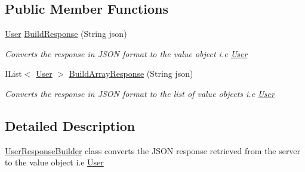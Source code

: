 \subsection*{Public Member Functions}
\begin{DoxyCompactItemize}
\item 
\hyperlink{classcom_1_1shephertz_1_1app42_1_1paas_1_1sdk_1_1csharp_1_1user_1_1_user}{User} \hyperlink{classcom_1_1shephertz_1_1app42_1_1paas_1_1sdk_1_1csharp_1_1user_1_1_user_response_builder_a3ecd2ba253a69bbaa30b44f162b0c8d1}{Build\+Response} (String json)
\begin{DoxyCompactList}\small\item\em Converts the response in J\+S\+O\+N format to the value object i.\+e \hyperlink{classcom_1_1shephertz_1_1app42_1_1paas_1_1sdk_1_1csharp_1_1user_1_1_user}{User} \end{DoxyCompactList}\item 
I\+List$<$ \hyperlink{classcom_1_1shephertz_1_1app42_1_1paas_1_1sdk_1_1csharp_1_1user_1_1_user}{User} $>$ \hyperlink{classcom_1_1shephertz_1_1app42_1_1paas_1_1sdk_1_1csharp_1_1user_1_1_user_response_builder_aceb70f765198db5c280215096ee280e8}{Build\+Array\+Response} (String json)
\begin{DoxyCompactList}\small\item\em Converts the response in J\+S\+O\+N format to the list of value objects i.\+e \hyperlink{classcom_1_1shephertz_1_1app42_1_1paas_1_1sdk_1_1csharp_1_1user_1_1_user}{User} \end{DoxyCompactList}\end{DoxyCompactItemize}


\subsection{Detailed Description}
\hyperlink{classcom_1_1shephertz_1_1app42_1_1paas_1_1sdk_1_1csharp_1_1user_1_1_user_response_builder}{User\+Response\+Builder} class converts the J\+S\+O\+N response retrieved from the server to the value object i.\+e \hyperlink{classcom_1_1shephertz_1_1app42_1_1paas_1_1sdk_1_1csharp_1_1user_1_1_user}{User} 



